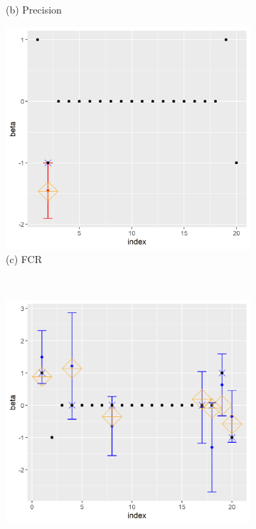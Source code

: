 \begin{figure}[ht!]
\begin{subfigure}[b]{.32\columnwidth}
    \caption{(b) Precision}
\end{subfigure}
\hfill
\centering
\begin{subfigure}[b]{.32\columnwidth} 
    \includegraphics[width=\columnwidth]{../../plot/p2_10_1_1.png}
    \caption{(c) FCR}
\end{subfigure}
\\
\centering
\begin{subfigure}[b]{.32\columnwidth} 
    \includegraphics[width=\columnwidth]{../../plot/split_20_1_1.png}

\end{subfigure}
\end{figure}
